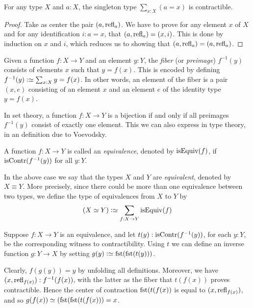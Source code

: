 \begin{lemma}\label{lem:thepathspaceiscontractible}
For any type $X$ and $a:X$, the singleton type $\sum_{x:X} (a=x)$ is contractible.
\end{lemma}

\begin{proof}
Take as center the pair $(a,\refl{a})$. We have
to prove for any element $x$ of $X$ and for any identification
$i: a=x$, that $(a,\refl{a}) = (x,i)$.  This is done by induction on $x$ and $i$, which reduces us to showing
that $(a,\refl{a}) = (a,\refl{a})$.
\end{proof}

\begin{definition}
\label{def:fiber}
Given a function $f : X \to Y$ and an element $y:Y$, 
the \emph{fiber} (or \emph{preimage}) $f^{-1}(y)$ consists 
of elements $x$ such that $y = f(x)$.  
This is encoded by defining $f^{-1}(y) \defeq \sum_{x:X} y = f(x)$.  
In other words, an element of the fiber is a pair $(x,e)$ consisting
of an element $x$ and an element $e$ of the identity type $y = f(x)$.
\end{definition}

In set theory, a function $f : X \to Y$ is a bijection if and only if
all preimages $f^{-1}(y)$ consist of exactly one element.
This we can also express in type theory, in an definition due
to Voevodsky. 

\begin{definition}
  \label{def:equivalence}
  A function $f : X \to Y$ is called an \emph{equivalence},
  denoted by $\mathrm{isEquiv}(f)$, if $\mathrm{isContr}(f^{-1}(y))$ for all $y:Y$.
\end{definition}

In the above case we say that the types
$X$ and $Y$ are \emph{equivalent}, denoted by $X\equiv Y$. 
More precisely, since there could be more than one equivalence
between two types, we define the type of equivalences from $X$ to $Y$ by
\[
(X\equiv Y) \defeq \sum_{f:X\to Y} \isEq(f) 
\]

Suppose $f:X \to Y$ is an equivalence, and let $t(y): \mathrm{isContr}(f^{-1}(y))$, for each $y:Y$, be the corresponding witness to contractibility.
Using $t$ we can define an inverse function $g : Y \to X$ by setting $g(y)\defeq\fst(\fst(t(y)))$.

Clearly, $f(g(y)) = y$ by unfolding all definitions.
Moreover, we have $(x,\refl{f(x)}) : f^{-1}(f(x))$,
with the latter as the fiber that $t(f(x))$
proves contractible. Hence the center of contraction
$\fst(t(f(x))$ is equal to $(x,\refl{f(x)})$, and so
$g(f(x))\jdeq(\fst(\fst(t(f(x))) = x$.

